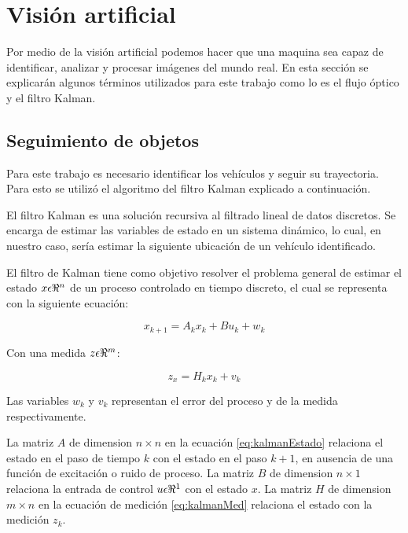\section{Visión artificial}

Por medio de la visión artificial podemos hacer que una maquina sea capaz de identificar, analizar y procesar imágenes del mundo real. En esta sección se explicarán algunos términos utilizados para este trabajo como lo es el flujo óptico y el filtro Kalman.

\subsection{Seguimiento de objetos}

Para este trabajo es necesario identificar los vehículos y seguir su trayectoria. Para esto se utilizó el algoritmo del filtro Kalman explicado a continuación.

El filtro Kalman es una solución recursiva al filtrado lineal de datos discretos. Se encarga de estimar las variables de estado en un sistema dinámico, lo cual, en nuestro caso, sería estimar la siguiente ubicación de un vehículo identificado.



El filtro de Kalman tiene como objetivo resolver el problema general de estimar el estado $x \space \epsilon \space \Re^{n}$ de un proceso controlado en tiempo discreto, el cual se representa con la siguiente ecuación:


\begin{equation}
\label{eq:kalmanEstado}
    x_{k+1} = A_kx_k + Bu_k + w_k
\end{equation}


Con una medida $z \space \epsilon \space \Re^{m}$:

\begin{equation}
\label{eq:kalmanMed}
    z_x = H_kx_k + v_k
\end{equation}


Las variables $w_k$ y $v_k$ representan el error del proceso y de la medida respectivamente.


La matriz $A$  de dimension $n\times{}n$ en la ecuación \eqref{eq:kalmanEstado} relaciona el estado en el paso de tiempo $k$ con el estado en el paso $k + 1$, en ausencia de una función de excitación o ruido de proceso. La matriz $B$ de dimension $n\times{}1$ relaciona la entrada de control $u \space \epsilon \Re^{1}$ con el estado $x$. La matriz $H$ de dimension $m\times{}n$ en la ecuación de medición \eqref{eq:kalmanMed} relaciona el estado con la medición $z_k$.


